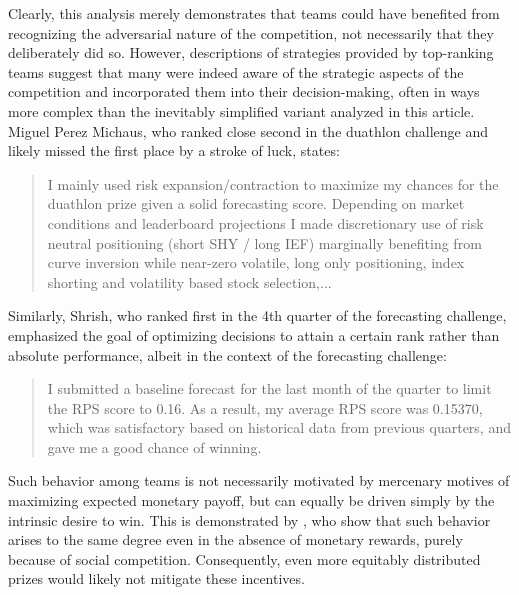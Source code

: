 \documentclass[3p,times,twocolumn]{elsarticle}
\begin{document}
Clearly, this analysis merely demonstrates that teams could have benefited from recognizing the adversarial nature of the competition, not necessarily that they deliberately did so.
However, descriptions of strategies provided by top-ranking teams suggest that many were indeed aware of the strategic aspects of the competition and incorporated them into their decision-making, often in ways more complex than the inevitably simplified variant analyzed in this article. 
Miguel Perez Michaus, who ranked close second in the duathlon challenge and likely missed the first place by a stroke of luck, states:
\begin{quote}
    I mainly used risk expansion/contraction to maximize my chances for the duathlon prize given a solid forecasting score.
    Depending on market conditions and leaderboard projections I made discretionary use of risk neutral positioning (short SHY / long IEF) marginally benefiting from curve inversion while near-zero volatile, long only positioning, index shorting and volatility based stock selection,...\citep{michausFinQBoostMachineLearning2023}
\end{quote}
Similarly, Shrish, who ranked first in the 4th quarter of the forecasting challenge, emphasized the goal of optimizing decisions to attain a certain rank rather than absolute performance, albeit in the context of the forecasting challenge:
\begin{quote}
    I submitted a baseline forecast for the last month of the quarter to limit the RPS score to 0.16. 
    As a result, my average RPS score was 0.15370, which was satisfactory based on historical data from previous quarters, and gave me a good chance of winning. \citep{shrishWinning6000Few2023}
\end{quote}
Such behavior among teams is not necessarily motivated by mercenary motives of maximizing expected monetary payoff, but can equally be driven simply by the intrinsic desire to win. 
This is demonstrated by \citet{dijkRankMattersImpact2014}, who show that such behavior arises to the same degree even in the absence of monetary rewards, purely because of social competition. 
Consequently, even more equitably distributed prizes would likely not mitigate these incentives.
\end{document}
